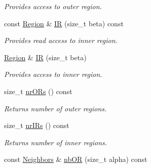 \begin{CompactItemize}
\begin{CompactList}\small\item\em Provides access to outer region. \item\end{CompactList}\item 
\hypertarget{classdai_1_1RegionGraph_fc3b5514a3667829d984e1b9bdf8f3b6}{
const \hyperlink{classdai_1_1Region}{Region} \& \hyperlink{classdai_1_1RegionGraph_fc3b5514a3667829d984e1b9bdf8f3b6}{IR} (size\_\-t beta) const }
\label{classdai_1_1RegionGraph_fc3b5514a3667829d984e1b9bdf8f3b6}

\begin{CompactList}\small\item\em Provides read access to inner region. \item\end{CompactList}\item 
\hypertarget{classdai_1_1RegionGraph_8cad2cb98698539d459ba2d0dbd5a14f}{
\hyperlink{classdai_1_1Region}{Region} \& \hyperlink{classdai_1_1RegionGraph_8cad2cb98698539d459ba2d0dbd5a14f}{IR} (size\_\-t beta)}
\label{classdai_1_1RegionGraph_8cad2cb98698539d459ba2d0dbd5a14f}

\begin{CompactList}\small\item\em Provides access to inner region. \item\end{CompactList}\item 
\hypertarget{classdai_1_1RegionGraph_383bfd8e082054b87170ad6f9bf13cc3}{
size\_\-t \hyperlink{classdai_1_1RegionGraph_383bfd8e082054b87170ad6f9bf13cc3}{nrORs} () const }
\label{classdai_1_1RegionGraph_383bfd8e082054b87170ad6f9bf13cc3}

\begin{CompactList}\small\item\em Returns number of outer regions. \item\end{CompactList}\item 
\hypertarget{classdai_1_1RegionGraph_b8038c7a58f3b50c0e8b0229522f20b7}{
size\_\-t \hyperlink{classdai_1_1RegionGraph_b8038c7a58f3b50c0e8b0229522f20b7}{nrIRs} () const }
\label{classdai_1_1RegionGraph_b8038c7a58f3b50c0e8b0229522f20b7}

\begin{CompactList}\small\item\em Returns number of inner regions. \item\end{CompactList}\item 
\hypertarget{classdai_1_1RegionGraph_a5e0c7aa216c1589b12c985f4c1712eb}{
const \hyperlink{classdai_1_1FactorGraph_326942db90fe2dbdf99041d5d966019e}{Neighbors} \& \hyperlink{classdai_1_1RegionGraph_a5e0c7aa216c1589b12c985f4c1712eb}{nbOR} (size\_\-t alpha) const }
\label{classdai_1_1RegionGraph_a5e0c7aa216c1589b12c985f4c1712eb}


\end{CompactItemize}
